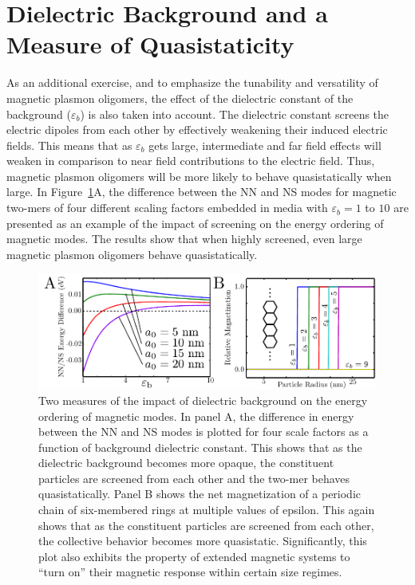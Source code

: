 \documentclass[journal=apchd5,manuscript=article]{achemso}
\begin{document}
\section{Dielectric Background and a Measure of Quasistaticity}

As an additional exercise, and to emphasize the tunability and versatility of magnetic plasmon oligomers, the effect of the dielectric constant of the background ($\varepsilon_{b}$) is also taken into account. The dielectric constant screens the electric dipoles from each other by effectively weakening their induced electric fields. This means that as $\varepsilon_{b}$ gets large, intermediate and far field effects will weaken in comparison to near field contributions to the electric field. Thus, magnetic plasmon oligomers will be more likely to behave quasistatically when large. In Figure~\ref{diel_eff}A, the difference between the NN and NS modes for magnetic two-mers of four different scaling factors embedded in media with $\varepsilon_{b} = 1$ to $10$ are presented as an example of the impact of screening on the energy ordering of magnetic modes. The results show that when highly screened, even large magnetic plasmon oligomers behave quasistatically.

\begin{figure}
\begin{center}
\includegraphics{diel_magnetization.pdf}
\caption{Two measures of the impact of dielectric background on the energy ordering of magnetic modes. In panel A, the difference in energy between the NN and NS modes is plotted for four scale factors as a function of background dielectric constant. This shows that as the dielectric background becomes more opaque, the constituent particles are screened from each other and the two-mer behaves quasistatically. Panel B shows the net magnetization of a periodic chain of six-membered rings at multiple values of epsilon. This again shows that as the constituent particles are screened from each other, the collective behavior becomes more quasistatic. Significantly, this plot also exhibits the property of extended magnetic systems to ``turn on'' their magnetic response within certain size regimes.}
\label{diel_eff}
\end{center}
\end{figure}
\end{document}
